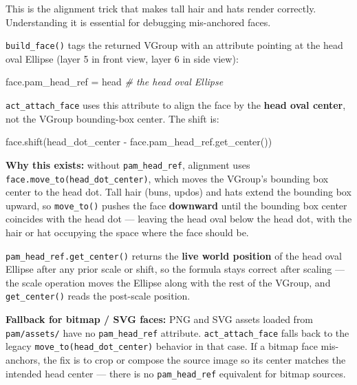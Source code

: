 \documentclass[
  11pt,
]{book}
\newenvironment{Shaded}{}{}
\newcommand{\CommentTok}[1]{\textcolor[rgb]{0.38,0.63,0.69}{\textit{#1}}}
\newcommand{\NormalTok}[1]{#1}
\newcommand{\OperatorTok}[1]{\textcolor[rgb]{0.40,0.40,0.40}{#1}}
\begin{document}
This is the alignment trick that makes tall hair and hats render
correctly. Understanding it is essential for debugging mis-anchored
faces.

\texttt{build\_face()} tags the returned VGroup with an attribute
pointing at the head oval Ellipse (layer 5 in front view, layer 6 in
side view):

\begin{Shaded}
\begin{Highlighting}[]
\NormalTok{face.pam\_head\_ref }\OperatorTok{=}\NormalTok{ head   }\CommentTok{\# the head oval Ellipse}
\end{Highlighting}
\end{Shaded}

\texttt{act\_attach\_face} uses this attribute to align the face by the
\textbf{head oval center}, not the VGroup bounding-box center. The shift
is:

\begin{Shaded}
\begin{Highlighting}[]
\NormalTok{face.shift(head\_dot\_center }\OperatorTok{{-}}\NormalTok{ face.pam\_head\_ref.get\_center())}
\end{Highlighting}
\end{Shaded}

\textbf{Why this exists:} without \texttt{pam\_head\_ref}, alignment
uses \texttt{face.move\_to(head\_dot\_center)}, which moves the VGroup's
bounding box center to the head dot. Tall hair (buns, updos) and hats
extend the bounding box upward, so \texttt{move\_to()} pushes the face
\textbf{downward} until the bounding box center coincides with the head
dot --- leaving the head oval below the head dot, with the hair or hat
occupying the space where the face should be.

\texttt{pam\_head\_ref.get\_center()} returns the \textbf{live world
position} of the head oval Ellipse after any prior scale or shift, so
the formula stays correct after scaling --- the scale operation moves
the Ellipse along with the rest of the VGroup, and
\texttt{get\_center()} reads the post-scale position.

\textbf{Fallback for bitmap / SVG faces:} PNG and SVG assets loaded from
\texttt{pam/assets/} have no \texttt{pam\_head\_ref} attribute.
\texttt{act\_attach\_face} falls back to the legacy
\texttt{move\_to(head\_dot\_center)} behavior in that case. If a bitmap
face mis-anchors, the fix is to crop or compose the source image so its
center matches the intended head center --- there is no
\texttt{pam\_head\_ref} equivalent for bitmap sources.
\end{document}
